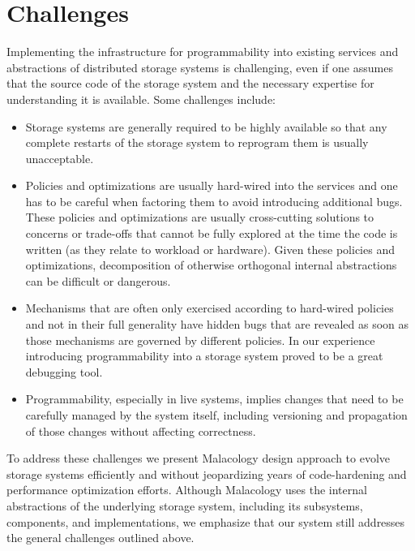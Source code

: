 \section{Challenges}
\label{sec:challenges}

Implementing the infrastructure for programmability into existing services and
abstractions of distributed storage systems is challenging, even if one assumes
that the source code of the storage system and the necessary expertise for
understanding it is available.  Some challenges include:

\begin{itemize}

\item Storage systems are generally required to be highly available so that any
complete restarts of the storage system to reprogram them is usually
unacceptable.

\item Policies and optimizations are usually hard-wired into the services and
one has to be careful when factoring them to avoid introducing additional bugs.
These policies and optimizations are usually cross-cutting solutions to
concerns or trade-offs that cannot be fully explored at the time the code is
written (as they relate to workload or hardware). Given these policies and
optimizations, decomposition of otherwise orthogonal internal abstractions can
be difficult or dangerous.

\item Mechanisms that are often only exercised according to hard-wired policies
and not in their full generality have hidden bugs that are revealed as soon as
those mechanisms are governed by different policies. In our experience
introducing programmability into a storage system proved to be a great
debugging tool.

\item Programmability, especially in live systems, implies changes that need to
be carefully managed by the system itself, including versioning and propagation
of those changes without affecting correctness.

\end{itemize}

To address these challenges we present Malacology  
 design approach to evolve storage systems efficiently and
without jeopardizing years of code-hardening and performance optimization
efforts.  Although Malacology uses the internal abstractions of the underlying
storage system, including its subsystems, components, and implementations, we
emphasize that our system still addresses the general challenges outlined
above.

